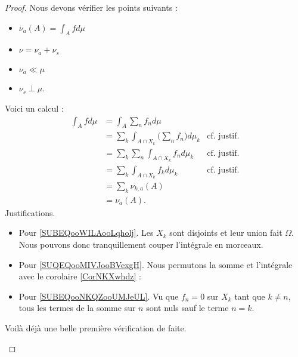\begin{proof}
	Nous devons vérifier les points suivants :
	\begin{itemize}
		\item
		      \( \nu_a(A)=\int_Afd\mu\)
		\item
		      $\nu=\nu_a+\nu_s$
		\item
		      \( \nu_a\ll \mu\)
		\item
		      \( \nu_s\perp\mu\).
	\end{itemize}
	\begin{subproof}
		\spitem[\( \int_Adf\mu=\nu(A)\)]
		Voici un calcul :
		\begin{subequations}
			\begin{align}
				\int_Afd\mu & =\int_A\sum_nf_nd\mu                                                                                 \\
				            & =\sum_k\int_{A\cap X_k}\big( \sum_nf_n \big)d\mu_k & \text{cf. justif.}	\label{SUBEQooWILAooLqholj}   \\
				            & = \sum_k\sum_n\int_{A\cap X_k}f_nd\mu_k            & \text{cf. justif.}\label{SUQEQooMIVJooBVexgH}    \\
				            & = \sum_k\int_{A\cap X_k}f_kd\mu_k                  & \text{cf. justif.}		\label{SUBEQooNKQZooUMJeUL} \\
				            & = \sum_k \nu_{k,a}(A)                                                                                \\
				            & =\nu_a(A).
			\end{align}
		\end{subequations}
		Justifications.
		\begin{itemize}
			\item
			      Pour \eqref{SUBEQooWILAooLqholj}. Les \( X_k\) sont disjoints et leur union fait \( \Omega\). Nous pouvons donc tranquillement couper l'intégrale en morceaux.
			\item
			      Pour \eqref{SUQEQooMIVJooBVexgH}.
			      Nous permutons la somme et l'intégrale avec le corolaire \ref{CorNKXwhdz} :
			\item
			      Pour \eqref{SUBEQooNKQZooUMJeUL}. Vu que \( f_n=0\) sur \( X_k\) tant que \( k\neq n\), tous les termes de la somme sur \( n\) sont nuls sauf le terme \( n=k\).
		\end{itemize}
		Voilà déjà une belle première vérification de faite.


\end{subproof}
\end{proof}
